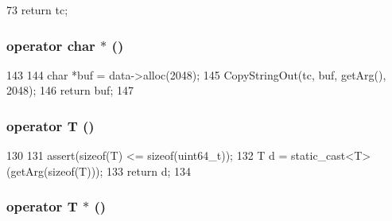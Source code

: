\begin{DoxyCode}
73 { return tc; }
\end{DoxyCode}
\hypertarget{classArguments_a2c2bebb89803c6d54e0fe24f41f24924}{
\subsubsection[{operator char $\ast$}]{\setlength{\rightskip}{0pt plus 5cm}operator char $\ast$ ()}}
\label{classArguments_a2c2bebb89803c6d54e0fe24f41f24924}



\begin{DoxyCode}
143                       {
144         char *buf = data->alloc(2048);
145         CopyStringOut(tc, buf, getArg(), 2048);
146         return buf;
147     }
\end{DoxyCode}
\hypertarget{classArguments_a4b15b6419d4ff99730ee9df795b90f61}{
\subsubsection[{operator T}]{\setlength{\rightskip}{0pt plus 5cm}operator T ()}}
\label{classArguments_a4b15b6419d4ff99730ee9df795b90f61}



\begin{DoxyCode}
130                  {
131         assert(sizeof(T) <= sizeof(uint64_t));
132         T d = static_cast<T>(getArg(sizeof(T)));
133         return d;
134     }
\end{DoxyCode}
\hypertarget{classArguments_a4e20322854ce5d78776cdaf1a87aacd9}{
\subsubsection[{operator T $\ast$}]{\setlength{\rightskip}{0pt plus 5cm}operator T $\ast$ ()}}
\label{classArguments_a4e20322854ce5d78776cdaf1a87aacd9}



